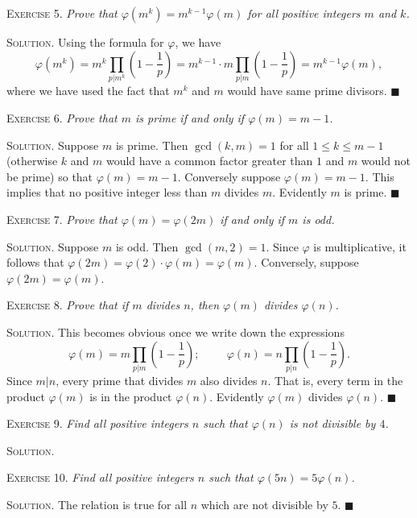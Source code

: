 \documentclass[11pt, leqno]{article}
\newcommand{\done}{\ensuremath{\blacksquare}}
\begin{document}
\textsc{Exercise 5}. \emph{Prove that $\varphi(m^k) = m^{k-1}\varphi(m)$ for all positive integers $m$ and $k$.}

\textsc{Solution}. Using the formula for $\varphi$, we have
\begin{displaymath}
\varphi(m^k) = m^k \prod_{p|m^k} \left(1-\frac{1}{p}\right) = m^{k-1}\cdot m \prod_{p|m}\left(1-\frac{1}{p}\right) = m^{k-1}\varphi(m),
\end{displaymath}
where we have used the fact that $m^k$ and $m$ would have same prime divisors. \done

\textsc{Exercise 6}. \emph{Prove that $m$ is prime if and only if $\varphi(m) = m-1$.}

\textsc{Solution}. Suppose $m$ is prime. Then $\gcd(k,m) = 1$ for all $1\leq k \leq m-1$ (otherwise $k$ and $m$ would have a common factor greater than $1$ and $m$ would not be prime) so that $\varphi(m) = m-1$. Conversely suppose $\varphi(m) = m-1$. This implies that no positive integer less than $m$ divides $m$. Evidently $m$ is prime. \done

\textsc{Exercise 7}. \emph{Prove that $\varphi(m) = \varphi(2m)$ if and only if $m$ is odd.}

\textsc{Solution}. Suppose $m$ is odd. Then $\gcd(m, 2)=1$. Since $\varphi$ is multiplicative, it follows that $\varphi(2m) = \varphi(2)\cdot \varphi(m) = \varphi(m)$. Conversely, suppose $\varphi(2m) = \varphi(m)$.

\textsc{Exercise 8}. \emph{Prove that if $m$ divides $n$, then $\varphi(m)$ divides $\varphi(n)$.}

\textsc{Solution}. This becomes obvious once we write down the expressions
\begin{displaymath}
\varphi(m) = m \prod_{p|m} \left(1-\frac{1}{p}\right); \hspace{1cm} \varphi(n) = n \prod_{p|n} \left(1-\frac{1}{p}\right).
\end{displaymath}
Since $m|n$, every prime that divides $m$ also divides $n$. That is, every term in the product $\varphi(m)$ is in the product $\varphi(n)$. Evidently $\varphi(m)$ divides $\varphi(n)$. \done

\textsc{Exercise 9}. \emph{Find all positive integers $n$ such that $\varphi(n)$ is not divisible by $4$.}

\textsc{Solution}.

\textsc{Exercise 10}. \emph{Find all positive integers $n$ such that $\varphi(5n) = 5\varphi(n)$.}

\textsc{Solution}. The relation is true for all $n$ which are not divisible by $5$. \done
\end{document}
